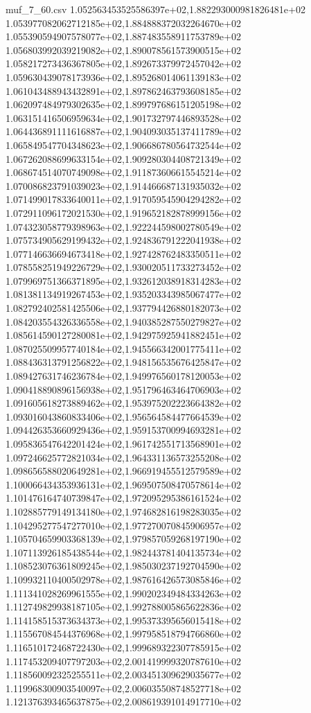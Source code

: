 \begin{filecontents*}{muf_7_60.csv}
1.052563453525586397e+02,1.882293000981826481e+02
1.053977082062712185e+02,1.884888372032264670e+02
1.055390594907578077e+02,1.887483558911753789e+02
1.056803992039219082e+02,1.890078561573900515e+02
1.058217273436367805e+02,1.892673379972457042e+02
1.059630439078173936e+02,1.895268014061139183e+02
1.061043488943432891e+02,1.897862463793608185e+02
1.062097484979302635e+02,1.899797686151205198e+02
1.063151416506959634e+02,1.901732797446893528e+02
1.064436891111616887e+02,1.904093035137411789e+02
1.065849547704348623e+02,1.906686780564732544e+02
1.067262088699633154e+02,1.909280304408721349e+02
1.068674514070749098e+02,1.911873606615545214e+02
1.070086823791039023e+02,1.914466687131935032e+02
1.071499017833640011e+02,1.917059545904294282e+02
1.072911096172021530e+02,1.919652182878999156e+02
1.074323058779398963e+02,1.922244598002780549e+02
1.075734905629199432e+02,1.924836791222041938e+02
1.077146636694673418e+02,1.927428762483350511e+02
1.078558251949226729e+02,1.930020511733273452e+02
1.079969751366371895e+02,1.932612038918314283e+02
1.081381134919267453e+02,1.935203343985067477e+02
1.082792402581425506e+02,1.937794426880182073e+02
1.084203554326336558e+02,1.940385287550279827e+02
1.085614590127280081e+02,1.942975925941882451e+02
1.087025509957740184e+02,1.945566342001775411e+02
1.088436313791256822e+02,1.948156535676425847e+02
1.089427631746236784e+02,1.949976560178120053e+02
1.090418890896156938e+02,1.951796463464706903e+02
1.091605618273889462e+02,1.953975202223664382e+02
1.093016043860833406e+02,1.956564584477664539e+02
1.094426353660929436e+02,1.959153700994693281e+02
1.095836547642201424e+02,1.961742551713568901e+02
1.097246625772821034e+02,1.964331136573255208e+02
1.098656588020649281e+02,1.966919455512579589e+02
1.100066434353936131e+02,1.969507508470578614e+02
1.101476164740739847e+02,1.972095295386161524e+02
1.102885779149134180e+02,1.974682816198283035e+02
1.104295277547277010e+02,1.977270070845906957e+02
1.105704659903368139e+02,1.979857059268197190e+02
1.107113926185438544e+02,1.982443781404135734e+02
1.108523076361809245e+02,1.985030237192704590e+02
1.109932110400502978e+02,1.987616426573085846e+02
1.111341028269961555e+02,1.990202349484334263e+02
1.112749829938187105e+02,1.992788005865622836e+02
1.114158515373634373e+02,1.995373395656015418e+02
1.115567084544376968e+02,1.997958518794766860e+02
1.116510172468722430e+02,1.999689322307785915e+02
1.117453209407797203e+02,2.001419999320787610e+02
1.118560092325255511e+02,2.003451309629035677e+02
1.119968300903540097e+02,2.006035508748527718e+02
1.121376393465637875e+02,2.008619391014917710e+02

\end{filecontents*}
